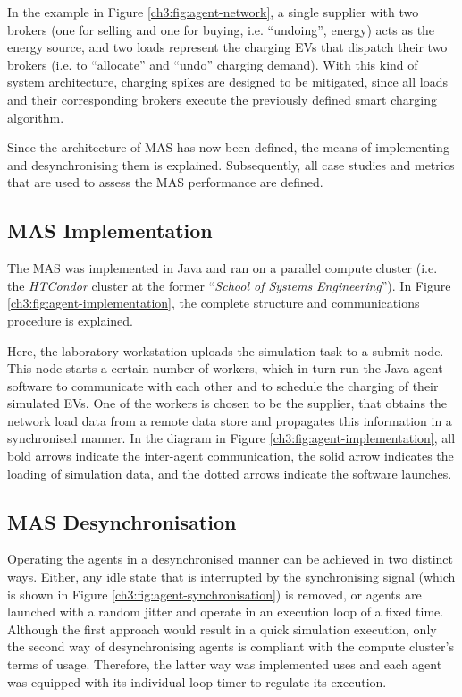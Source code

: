 In the example in Figure \ref{ch3:fig:agent-network}, a single supplier with two brokers (one for selling and one for buying, i.e. ``undoing'', energy) acts as the energy source, and two loads represent the charging EVs that dispatch their two brokers (i.e. to ``allocate'' and ``undo'' charging demand).
With this kind of system architecture, charging spikes are designed to be mitigated, since all loads and their corresponding brokers execute the previously defined smart charging algorithm.

Since the architecture of MAS has now been defined, the means of implementing and desynchronising them is explained.
Subsequently, all case studies and metrics that are used to assess the MAS performance are defined.

\subsection{MAS Implementation}
\label{ch3:subsec:implementation}

The MAS was implemented in Java and ran on a parallel compute cluster (i.e. the \textit{HTCondor} cluster at the former ``\textit{School of Systems Engineering}'').
In Figure \ref{ch3:fig:agent-implementation}, the complete structure and communications procedure is explained.



Here, the laboratory workstation uploads the simulation task to a submit node.
This node starts a certain number of workers, which in turn run the Java agent software to communicate with each other and to schedule the charging of their simulated EVs.
One of the workers is chosen to be the supplier, that obtains the network load data from a remote data store and propagates this information in a synchronised manner.
In the diagram in Figure \ref{ch3:fig:agent-implementation}, all bold arrows indicate the inter-agent communication, the solid arrow indicates the loading of simulation data, and the dotted arrows indicate the software launches.

\subsection{MAS Desynchronisation}
\label{ch3:subsec:desynchronisation}

Operating the agents in a desynchronised manner can be achieved in two distinct ways.
Either, any idle state that is interrupted by the synchronising signal (which is shown in Figure \ref{ch3:fig:agent-synchronisation}) is removed, or agents are launched with a random jitter and operate in an execution loop of a fixed time.
Although the first approach would result in a quick simulation execution, only the second way of desynchronising agents is compliant with the compute cluster's terms of usage.
Therefore, the latter way was implemented uses and each agent was equipped with its individual loop timer to regulate its execution.

